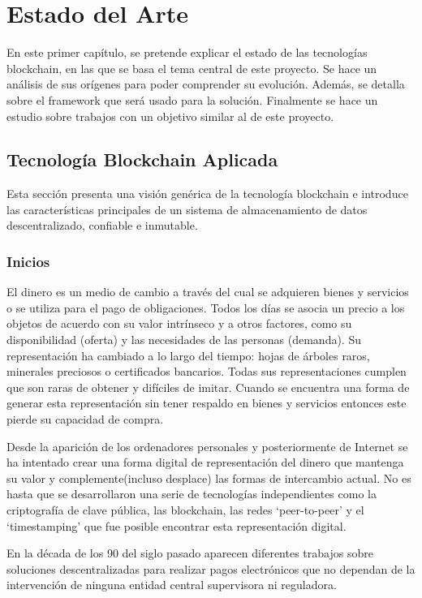 \chapter{Estado del Arte}\label{chapter:state-of-the-art}

En este primer capítulo, se pretende explicar el estado de las tecnologías blockchain, en las que se basa el tema central de este proyecto.
Se hace un análisis de sus orígenes para poder comprender su evolución.
Además, se detalla sobre el framework que será usado para la solución.
Finalmente se hace un estudio sobre trabajos con un objetivo similar al de este proyecto.

\section{Tecnología Blockchain Aplicada}

Esta sección presenta una visión genérica de la tecnología blockchain e introduce las características principales de un sistema de almacenamiento de datos descentralizado, confiable e inmutable.

\subsection{Inicios}

El dinero es un medio de cambio a través del cual se adquieren bienes y servicios o se utiliza para el pago de obligaciones. Todos los días se asocia un precio a los objetos de acuerdo con su valor intrínseco y a otros factores, como su disponibilidad (oferta) y las necesidades de las personas (demanda). Su representación ha cambiado a lo largo del tiempo: hojas de árboles raros, minerales preciosos o certificados bancarios. Todas sus representaciones cumplen que son raras de obtener y difíciles de imitar. Cuando se encuentra una forma de generar esta representación sin tener respaldo en bienes y servicios entonces este pierde su capacidad de compra.

Desde la aparición de los ordenadores personales y posteriormente de Internet se ha intentado crear una forma digital de representación del dinero que mantenga su valor y complemente(incluso desplace) las formas de intercambio actual. No es hasta que se desarrollaron una serie de tecnologías independientes como la criptografía de clave pública, las blockchain, las redes `peer-to-peer' y el  `timestamping' que fue posible encontrar esta representación digital.

En la década de los 90 del siglo pasado aparecen diferentes trabajos sobre soluciones descentralizadas para realizar pagos electrónicos que no dependan de la intervención de ninguna entidad central supervisora ni reguladora.

